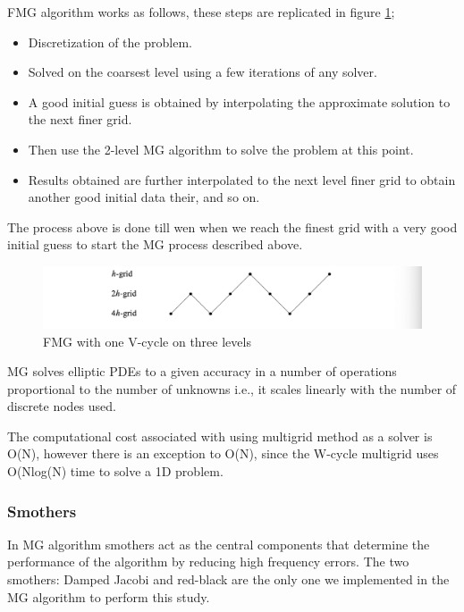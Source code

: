 \documentclass[12pt,a4paper]{article}
\begin{document}
		\noindent FMG algorithm works as follows, these steps are replicated in figure \ref{fig:FMG};

	\begin{itemize}
		\item Discretization of the problem.
		\item Solved on the coarsest level using a few iterations of any solver.
		\item A good initial guess is obtained by interpolating the approximate solution to the next finer grid.
		\item Then use the 2-level MG algorithm to solve the problem at this point.
		\item Results obtained are further interpolated to the next level finer grid to obtain another good initial data their, and so on.
	\end{itemize}
	
		\noindent The process above is done till wen when we reach the finest grid with a very good initial guess to start the MG process described above.
	
	\begin{figure}[H]
		\centering
		\includegraphics[width=0.7\linewidth]{"Screenshot 2021-03-19 at 2.17.26 AM"}
		\caption{FMG with one V-cycle on three levels}
		\label{fig:FMG}
	\end{figure}
	
	\noindent MG solves elliptic PDEs to a given accuracy in a number of operations proportional to the number of unknowns i.e., it scales linearly with the number of discrete nodes used.
	
	\noindent The computational cost associated with using multigrid method as a solver  is O(N), however there is an exception to O(N), since the W-cycle multigrid uses O(Nlog(N) time to solve a 1D problem.
	
	\subsubsection{Smothers}
	In MG algorithm smothers act as the central components that determine the performance of the algorithm by reducing high frequency errors. The two smothers: Damped Jacobi and red-black are the only one we implemented in the MG algorithm to perform this study.  
\end{document}
